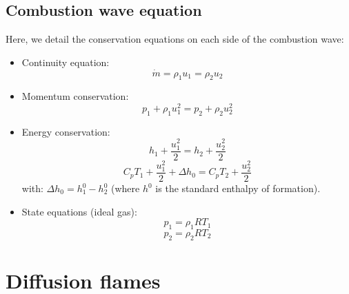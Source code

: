 \documentclass[a4paper,11pt]{article}
\begin{document}
\subsection{Combustion wave equation}
Here, we detail the conservation equations on each side of the combustion wave:\\
\begin{itemize}
	\item Continuity equation:
	\[\dot{m}=\rho_1 u_1=\rho_2 u_2\]
	\item Momentum conservation:
	\[p_1 + \rho_1 u_1^2 = p_2 + \rho_2 u_2^2 \]
	\item Energy conservation:
	\[   	h_1 + \frac{u_1^2}{2} =  h_2 + \frac{u_2^2}{2} \]
	\[   	C_pT_1 + \frac{u_1^2}{2} + \Delta h_0=  C_pT_2 + \frac{u_2^2}{2} \]
	with: $\Delta h_0 = h_1^0 - h_2^0$ (where $h^0$ is the standard enthalpy of formation).
	\item State equations (ideal gas):
	\[p_1 =  \rho_1 R T_1  \]
	\[p_2 =  \rho_2 R T_2  \]
\end{itemize}















\pagebreak
\section{Diffusion flames}
\pagebreak


\appendix
\end{document}
